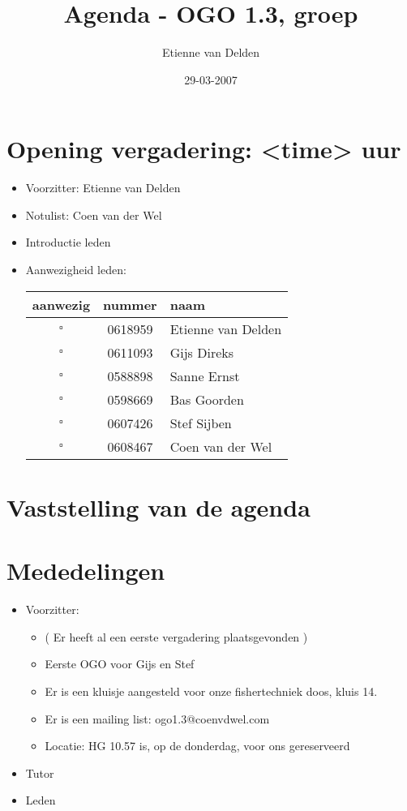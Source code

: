 \documentclass[]{article}
\title{Agenda - OGO 1.3, groep }
\author{ Etienne van Delden  }
\date{29-03-2007}
\begin{document}
\maketitle


\section{Opening vergadering: <time> uur }
  \begin{itemize}
    \item Voorzitter: Etienne van Delden
    \item Notulist: Coen van der Wel
    \item Introductie leden
    \item Aanwezigheid leden:

    \begin{tabular}{c | c | l}
      aanwezig & nummer & naam \\
      \hline
      $\square$ & 0618959 & Etienne van Delden \\
      $\square$ & 0611093 & Gijs Direks \\
      $\square$ & 0588898 & Sanne Ernst \\
      $\square$ & 0598669 & Bas Goorden \\
      $\square$ & 0607426 & Stef Sijben\\
      $\square$ & 0608467 & Coen van der Wel \\

    \end{tabular}

  \end{itemize}

\section{Vaststelling van de agenda}


\section{Mededelingen}
\begin{itemize}
  \item Voorzitter:
  \begin{itemize}
    \item ( Er heeft al een eerste vergadering plaatsgevonden )
     \item Eerste OGO voor Gijs en Stef
     \item Er is een kluisje aangesteld voor onze fishertechniek doos, kluis 14.
     \item Er is een mailing list: ogo1.3@coenvdwel.com
     \item Locatie: HG 10.57 is, op de donderdag, voor ons gereserveerd
  \end{itemize}
  \item Tutor
  \item Leden
\end{itemize}
\end{document}
